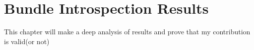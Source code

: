 \chapter{Bundle Introspection Results}

This chapter will make a deep analysis of results and prove that my contribution is valid(or not)

